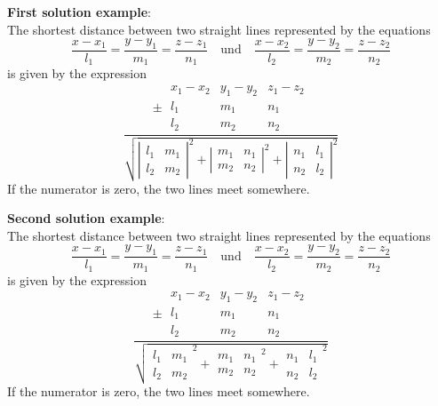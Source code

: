 \documentclass{article}
\begin{document}
\noindent\textbf{First solution example}:\\[1ex]
The shortest distance between two straight lines represented by the equations
\[ \frac{x-x_1}{l_1} = \frac{y-y_1}{m_1} = \frac{z-z_1}{n_1}\quad\mbox{und}%
\quad%
   \frac{x-x_2}{l_2} = \frac{y-y_2}{m_2} = \frac{z-z_2}{n_2}               \]
is given by the expression
\[ \frac{\pm\;\begin{array}{|ccc|}
     x_1 - x_2 & y_1 - y_2 & z_1 - z_2 \\
	 l_1   &     m_1   &    n_1    \\
	 l_2   &     m_2   &    n_2
    \end{array}}{
    \sqrt{\left|\begin{array}{cc} l_1 & m_1 \\ l_2 & m_2 \end{array}\right|^2
	+ \left|\begin{array}{cc} m_1 & n_1 \\ m_2 & n_2 \end{array}\right|^2
	+ \left|\begin{array}{cc} n_1 & l_1 \\ n_2 & l_2 \end{array}\right|^2}
		}   \]
If the numerator is zero, the two lines meet somewhere.

\bigskip
\noindent\textbf{Second solution example}:\\[1ex]
The shortest distance between two straight lines represented by the equations
\[ \frac{x-x_1}{l_1} = \frac{y-y_1}{m_1} = \frac{z-z_1}{n_1}\quad\mbox{und}%
\quad%
   \frac{x-x_2}{l_2} = \frac{y-y_2}{m_2} = \frac{z-z_2}{n_2}               \]
is given by the expression
\[ \frac{\pm\;\begin{array}{|ccc|}
     x_1 - x_2 & y_1 - y_2 & z_1 - z_2 \\
	 l_1   &     m_1   &    n_1    \\
	 l_2   &     m_2   &    n_2
    \end{array}}{
    \sqrt{\begin{array}{|cc|} l_1 & m_1 \\ l_2 & m_2 \end{array}^2
	    + \begin{array}{|cc|} m_1 & n_1 \\ m_2 & n_2 \end{array}^2
	    + \begin{array}{|cc|} n_1 & l_1 \\ n_2 & l_2 \end{array}^2}
		}   \]
If the numerator is zero, the two lines meet somewhere.
\end{document}
